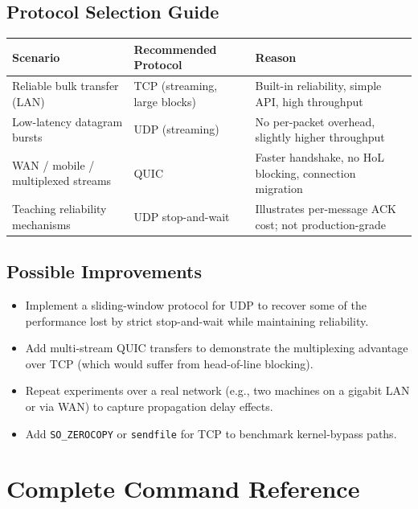 \documentclass[12pt,a4paper]{article}
\begin{document}
\subsection{Protocol Selection Guide}

\begin{center}
\begin{tabular}{p{3.5cm}p{4cm}p{4cm}}
\toprule
\textbf{Scenario} & \textbf{Recommended Protocol} & \textbf{Reason} \\
\midrule
Reliable bulk transfer (LAN) &
  TCP (streaming, large blocks) &
  Built-in reliability, simple API, high throughput \\
\addlinespace
Low-latency datagram bursts &
  UDP (streaming) &
  No per-packet overhead, slightly higher throughput \\
\addlinespace
WAN / mobile / multiplexed streams &
  QUIC &
  Faster handshake, no HoL blocking, connection migration \\
\addlinespace
Teaching reliability mechanisms &
  UDP stop-and-wait &
  Illustrates per-message ACK cost; not production-grade \\
\bottomrule
\end{tabular}
\end{center}

\subsection{Possible Improvements}

\begin{itemize}
  \item Implement a sliding-window protocol for UDP to recover some of the
        performance lost by strict stop-and-wait while maintaining reliability.
  \item Add multi-stream QUIC transfers to demonstrate the multiplexing
        advantage over TCP (which would suffer from head-of-line blocking).
  \item Repeat experiments over a real network (e.g., two machines on a
        gigabit LAN or via WAN) to capture propagation delay effects.
  \item Add \texttt{SO\_ZEROCOPY} or \texttt{sendfile} for TCP to benchmark
        kernel-bypass paths.
\end{itemize}

\appendix
\section{Complete Command Reference}
\label{app:cmd}
\end{document}
